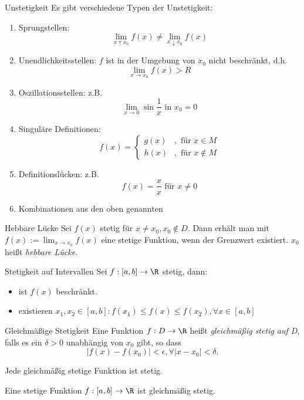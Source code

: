 \documentclass[german]{../spicker}
\renewcommand{\abs}[1]{\left| #1 \right|}
\begin{document}
\begin{defi}{Unstetigkeit}
    Es gibt verschiedene Typen der Unstetigkeit:
    \begin{enumerate}
        \item Sprungstellen:
              $$
                  \lim_{x\uparrow x_0} f(x) \neq\lim_{x\downarrow x_0} f(x)
              $$
        \item Unendlichkeitsstellen: $f$ ist in der Umgebung von $x_0$ nicht beschränkt, d.h.
              $$
                  \lim_{x\to x_0} f(x) > R
              $$
        \item Oszillationsstellen: z.B.
              $$
                  \lim_{x\to 0} \sin \frac{1}{x} \text{ in } x_0 = 0
              $$
        \item Singuläre Definitionen:
              $$
                  f(x) = \begin{cases}
                      g(x) & , \text{ für } x \in M    \\
                      h(x) & , \text{ für } x \notin M
                  \end{cases}
              $$
        \item Definitionslücken: z.B.
              $$
                  f(x) = \frac{x}{x} \text{ für } x \neq 0
              $$
        \item Kombinationen aus den oben genannten
    \end{enumerate}
\end{defi}

\begin{defi}{Hebbare Lücke}
    Sei $f(x)$ stetig für $x\neq x_0, x_0 \notin D$.
    Dann erhält man mit $f(x) := \lim_{x\to x_0} f(x)$ eine stetige Funktion, wenn der Grenzwert existiert.
    $x_0$ heißt \emph{hebbare Lücke}.
\end{defi}

\begin{bonus}{Stetigkeit auf Intervallen}
    Sei $f : [a, b] \to \R$ stetig, dann:
    \begin{itemize}
        \item ist $f(x)$ beschränkt.
        \item existieren $x_1, x_2 \in [a, b]: f(x_1) \leq f(x) \leq f(x_2), \forall x \in [a, b]$
    \end{itemize}
\end{bonus}

\begin{defi}{Gleichmäßige Stetigkeit}
    Eine Funktion $f : D \to \R$ heißt \emph{gleichmäßig stetig auf D}, falls es ein $\delta > 0$ unabhängig von $x_0$ gibt, so dass
    $$
        \abs{f(x) - f(x_0)} < \epsilon, \forall \abs{x-x_0} < \delta.
    $$

    Jede gleichmäßig stetige Funktion ist stetig.

    Eine stetige Funktion $f : [a, b] \to \R$ ist gleichmäßig stetig.
\end{defi}
\end{document}
